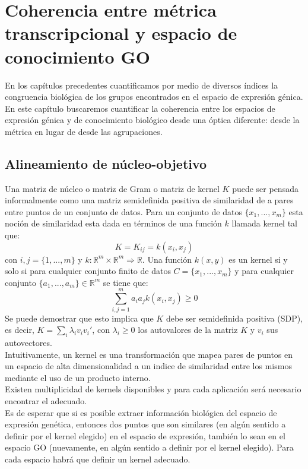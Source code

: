 \chapter{Coherencia entre métrica transcripcional y espacio de conocimiento GO}
En los capítulos precedentes cuantificamos por medio de diversos índices la congruencia biológica de los grupos encontrados en el espacio de expresión génica. En este capítulo buscaremos cuantificar la coherencia entre los espacios de expresión génica y de conocimiento biológico desde una óptica diferente: desde la métrica en lugar de desde las agrupaciones.
\section{Alineamiento de núcleo-objetivo}
Una matriz de núcleo o matriz de Gram o matriz de kernel $K$ puede ser pensada informalmente como una matriz semidefinida positiva de similaridad de a pares entre puntos de un conjunto de datos. Para un conjunto de datos $\{x_1,...,x_m\}$ esta noción de similaridad esta dada en términos de una función $k$ llamada kernel tal que:
\begin{equation}
	K = K_{ij} = k(x_i, x_j)
\end{equation}
con $i,j=\{1,...,m\}$ y $k: \mathbb{R}^m \times \mathbb{R}^m \Rightarrow \mathbb{R}$. Una función $k(x, y)$ es un kernel si y solo si para cualquier conjunto finito de datos $C=\{x_1,...,x_m\}$ y para cualquier conjunto $\{a_1,...,a_m\} \in \mathbb{R}^m$ se tiene que:
\begin{equation}
	\sum_{i,j=1}^m a_ia_jk(x_i, x_j)\geq 0
\end{equation}
Se puede demostrar que esto implica que $K$ debe ser semidefinida positiva (SDP), es decir, $K=\sum_i \lambda _i v_i v_i'$, con $\lambda _i \geq 0$ los autovalores de la matriz $K$ y $v_i$ sus autovectores.\\
Intuitivamente, un kernel es una transformación que mapea pares de puntos en un espacio de alta dimensionalidad a un indice de similaridad entre los mismos mediante el uso de un producto interno.\\
Existen multiplicidad de kernels disponibles y para cada aplicación será necesario encontrar el adecuado.\\
Es de esperar que si es posible extraer información biológica del espacio de expresión genética, entonces dos puntos que son similares (en algún sentido a definir por el kernel elegido) en el espacio de expresión, también lo sean en el espacio GO (nuevamente, en algún sentido a definir por el kernel elegido). Para cada espacio habrá que definir un kernel adecuado.\\
